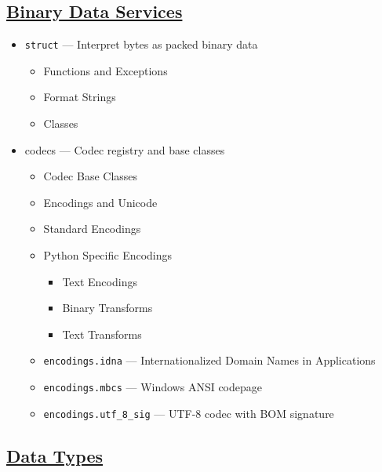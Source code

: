 \documentclass[]{book}
\providecommand{\tightlist}{%
  \setlength{\itemsep}{0pt}\setlength{\parskip}{0pt}}
\theoremstyle{definition}
\theoremstyle{definition}
\theoremstyle{definition}
\theoremstyle{remark}
\begin{document}
\subsection{\texorpdfstring{\href{https://docs.python.org/3.7/library/binary.html}{Binary
Data Services}}{Binary Data Services}}\label{binary-data-services}

\begin{itemize}
\tightlist
\item
  \texttt{struct} --- Interpret bytes as packed binary data

  \begin{itemize}
  \tightlist
  \item
    Functions and Exceptions
  \item
    Format Strings
  \item
    Classes
  \end{itemize}
\item
  codecs --- Codec registry and base classes

  \begin{itemize}
  \tightlist
  \item
    Codec Base Classes
  \item
    Encodings and Unicode
  \item
    Standard Encodings
  \item
    Python Specific Encodings

    \begin{itemize}
    \tightlist
    \item
      Text Encodings
    \item
      Binary Transforms
    \item
      Text Transforms
    \end{itemize}
  \item
    \texttt{encodings.idna} --- Internationalized Domain Names in
    Applications
  \item
    \texttt{encodings.mbcs} --- Windows ANSI codepage
  \item
    \texttt{encodings.utf\_8\_sig} --- UTF-8 codec with BOM signature
  \end{itemize}
\end{itemize}

\subsection{\texorpdfstring{\href{https://docs.python.org/3.7/library/datatypes.html}{Data
Types}}{Data Types}}\label{data-types}
\end{document}
